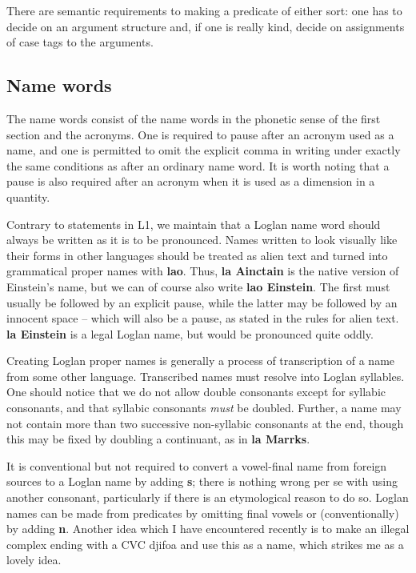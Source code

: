 \documentclass[12pt]{book}
\begin{document}
{There are semantic requirements to making a predicate of either sort:  one has to decide on an argument structure and, if one is really kind, decide on assignments of case tags to the arguments.

\subsection{Name words}

The name words consist of the name words in the phonetic sense of the first section and the acronyms.   One is required to pause after an acronym used as a name, and one is permitted
to omit the explicit comma in writing under exactly the same conditions as after an ordinary name word.  It is worth noting that a pause is also required after an acronym when it is used as a dimension in a quantity.

Contrary to statements in L1, we maintain that a Loglan name word should always be written as it is to be pronounced.   Names written to look visually like their forms in other languages
should be treated as alien text and turned into grammatical proper names with {\bf lao}.   Thus, {\bf la Ainctain} is the native version of Einstein's name, but we can of course also write
{\bf lao Einstein}.   The first must usually be followed by an explicit pause, while the latter may be followed by an innocent space -- which will also be a pause, as stated in the rules for alien text.
{\bf la Einstein} is a legal Loglan name, but would be pronounced quite oddly.

Creating Loglan proper names is generally a process of transcription of a name from some other language.  Transcribed names must resolve into Loglan syllables.  One should notice that we do not allow double consonants except for syllabic consonants, and that syllabic consonants {\em must\/} be doubled.  Further, a name may not contain more than two successive non-syllabic consonants at the end, though this may be fixed by doubling a continuant, as in {\bf la Marrks}.

It is conventional but not required to convert a vowel-final name from foreign sources to a Loglan name by adding {\bf s};  there is nothing wrong per se with using another consonant, particularly if there is an etymological reason to do so.   Loglan names can be made from predicates by omitting final vowels or (conventionally) by adding {\bf n}.  Another idea which I have encountered recently is to make an illegal complex ending with a CVC djifoa and use this as a name, which strikes me as a lovely idea.

}
\end{document}
